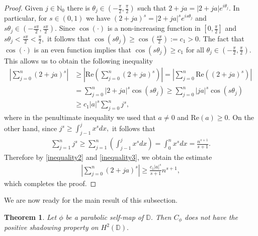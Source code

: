 \documentclass[11pt]{amsart}
\theoremstyle{plain}
\newtheorem{theorem}[definition]{Theorem}
\theoremstyle{remark}
\theoremstyle{plain}
\begin{document}
\begin{proof} Given $j\in  \mathbb{N}_0$  there is $\theta_j\in (-\frac{\pi}{2}, \frac{\pi}{2})$ such that $2+ja=|2+ja|e^{i\theta_j}.$ In particular, for $s\in(0,1)$ we have $(2+ja)^s=|2+ja|^se^{is\theta_j}$ and $s\theta_j\in(-\frac{s\pi}{2}, \frac{s\pi}{2}). $ Since $\cos(\cdot)$ is a non-increasing function in $[0, \frac{\pi}{2}]$ and $s\theta_j<\frac{s\pi}{2}<\frac{\pi}{2},$ it follows that $\cos(s\theta_j)\geq \cos (\frac{s\pi}{2}):=c_1>0.$ The fact that $\cos(\cdot)$ is an even function implies that $\cos(s \theta_j) \geq c_1$ for all $\theta_j \in ( - \frac{\pi}{2}, \frac{\pi}{2})$. This allows us to obtain the following inequality
\begin{align}\label{inequality2}
\left|\sum\limits_{j = 0}^{n} (2 + ja)^s \right| & \geq \left|\mathrm{Re} ( \sum\limits_{j = 0}^{n} (2 + ja)^s )\right| = \left|\sum\limits_{j = 0}^{n} \mathrm{Re}  ((2 + ja)^s)  \right|\nonumber \\
& =  \sum\limits_{j = 0}^{n} |2 + ja|^s \cos(s \theta_j) {\geq} \sum\limits_{j = 0}^{n} |ja|^s \cos(s \theta_j)\nonumber \\ 
& \geq c_1 |a|^{s} \sum\limits_{j = 0}^{n} j^{s},
\end{align}
where in the penultimate inequality we used that $a \neq 0$ and $\mathrm{Re}(a) \geq 0$. On the other hand, since $j^s \geq \displaystyle \int_{j - 1}^{j} x^{s}dx,$ it follows that
\begin{align}\label{inequality3}
\sum_{j = 1}^{n} j^s \geq \sum_{j = 1}^{n}  \left( \int_{j - 1}^{j} x^sdx \right) = \int_{0}^{n} x^sdx = \frac{n^{s + 1}}{s + 1}.
\end{align}
Therefore by \eqref{inequality2} and \eqref{inequality3}, we obtain the estimate
\begin{align*}
\left|\sum\limits_{j = 0}^{n} (2 + ja)^s \right| \geq \frac{c_1 |a|^{s}}{s + 1} n^{s + 1},
\end{align*}
which completes the proof.
\end{proof}

 We are now ready for the main result of this subsection.

\begin{theorem}\label{parabolic} Let $\phi$ be a parabolic self-map of $\mathbb{D}.$ Then  $C_{\phi}$ does not have the positive shadowing property on $H^{2}(\mathbb{D}).$ 
\end{theorem}
\end{document}
